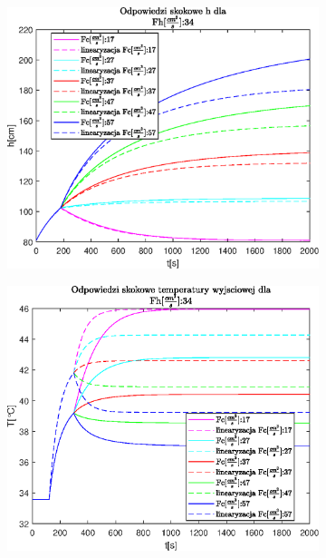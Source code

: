 \begin{figure}[h!]
   \centering
   \begin{subfigure}[b]{0.6\textwidth}
      \includegraphics[width=1\linewidth]{img/step-responses/stepResponseHFh34.eps}
      \caption{}
      \label{fig:fig:stepResponsesFh341}
   \end{subfigure}
       
   \begin{subfigure}[b]{0.6\textwidth}
      \includegraphics[width=1\linewidth]{img/step-responses/stepResponseToutFh34.eps}
      \caption{}
      \label{fig:fig:stepResponsesFh342}
   \end{subfigure}
       

\end{figure}
